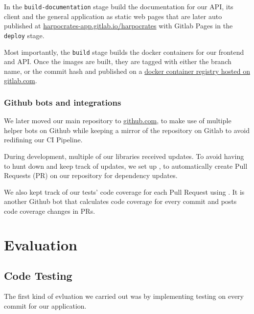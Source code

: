 \documentclass[\version]{l4proj}
\begin{document}
In the \verb|build-documentation| stage build the documentation for our API, its client and the general application as static web pages that are later auto published at \href{https://harpocrates-app.gitlab.io/harpocrates/}{harpocrates-app.gitlab.io/harpocrates} with Gitlab Pages in the \verb|deploy| stage.

Most importantly, the \verb|build| stage builds the docker containers for our frontend and API.
Once the images are built, they are tagged with either the branch name, or the commit hash and published on a \href{https://gitlab.com/harpocrates-app/harpocrates/container_registry}{docker container registry hosted on gitlab.com}.

\subsection{Github bots and integrations}

We later moved our main repository to \href{https://github.com/guillaumedsde/Harpocrates}{github.com}, to make use of multiple helper bots on Github while keeping a mirror of the repository on Gitlab to avoid redifining our CI Pipeline.

During development, multiple of our libraries received updates.
To avoid having to hunt down and keep track of updates, we set up \textcite{Dependabot2020}, to automatically create Pull Requests (PR) on our repository for dependency updates.

We also kept track of our tests' code coverage for each Pull Request using \textcite{Codecov2020}.
It is another Github bot that calculates code coverage for every commit and posts code coverage changes in PRs.

\chapter{Evaluation}


\section{Code Testing}

The first kind of evluation we carried out was by implementing testing on every commit for our application.
\end{document}
